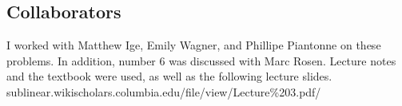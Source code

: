\documentclass[letterpaper, 11pt]{article}
\begin{document}
\pagebreak
\subsection*{Collaborators}
I worked with Matthew Ige, Emily Wagner, and Phillipe Piantonne on these problems. In addition, number 6 was discussed with Marc Rosen. Lecture notes and the textbook were used, as well as the following lecture slides.\\
sublinear.wikischolars.columbia.edu/file/view/Lecture\%203.pdf/
\end{document}
